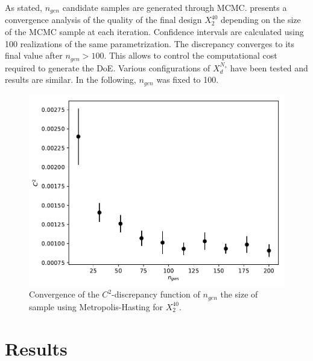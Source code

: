 As stated, $n_{gen}$ candidate samples are generated through MCMC.  presents a convergence analysis of the quality of the final design $X_2^{40}$ depending on the size of the MCMC sample at each iteration. Confidence intervals are calculated using 100 realizations of the same parametrization. The discrepancy converges to its final value after $n_{gen}>100$. This allows to control the computational cost required to generate the DoE. Various configurations of $X_d^{N_s}$ have been tested and results are similar. In the following, $n_{gen}$ was fixed to 100.

\begin{figure}[!h]
\centering
\includegraphics[width=0.9\linewidth,keepaspectratio]{fig/contributions/doe/conv_C2-Ngen-Kdoe2-40.pdf}
\caption{Convergence of the $C^2$-discrepancy function of $n_{gen}$ the size of sample using Metropolis-Hasting for $X_2^{40}$.}
\label{fig:conv-ngen}
\end{figure}





\section{Results}\label{sec:results}

